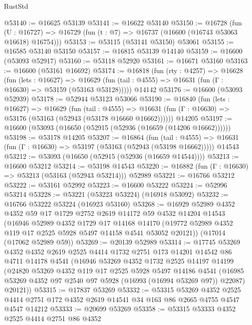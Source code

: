 \begin{lexlean}{RustStd}
\begin{coremodule}
{\begin{coremodule}
{{{{{{{{{{{{{{{{{{{{{{{{{{{{{{{{{{{{{{{{{{{{{{{{{{{{{{{@53140 := @16625 @53139
@53141 := @16622 @53140
@53150 := @16728
    (fun (U : @16727) => @16729 (fun (t : @7) => @16737 (@16600 (@16743 @53063 @16618) @16754)))
@53153 := @53115 (@53141 @53150) @53061
@53155 := @16585 @53140 @53150
@53157 := @16815 @53139 @14140
@53159 := @16600 (@53093 @52917)
@53160 := @53118 @52920
@53161 := @16671 @53160
@53163 := @16600 (@53161 @16692)
@53174 := @16818
    (fun (rty : @4257) =>
    @16628
      (fun (lets : @16627) =>
      @16629 (fun (tail : @4555) => @16631 (fun (Γ : @16630) => @53159 (@53163 @53128)))))
    @14142
@53176 := @16600 (@53093 @52939)
@53178 := @52944 @53123 @53066
@53190 := @16840
    (fun (lets : @16627) =>
    @16629
      (fun (tail : @4555) =>
      @16631 (fun (Γ : @16630) => @53176 (@53163 (@52943 (@53178 @16660 @16662))))))
    @14205
@53197 := @16600 (@53093 (@16650 (@52915 (@52936 (@16659 (@14206 @16662))))))
@53198 := @53178 @14205
@53207 := @16864
    (fun (tail : @4555) => @16631 (fun (Γ : @16630) => @53197 (@53163 (@52943 (@53198 @16662)))))
    @14543
@53212 := @53093 (@16650 (@52915 (@52936 (@16659 @14544))))
@53213 := @16600 @53212
@53214 := @53198 @14543
@53220 := @16882 (fun (Γ : @16630) => @53213 (@53163 (@52943 @53214))) @52989
@53221 := @16766 @53212
@53222 := @53161 @52992
@53223 := @16600 @53222
@53224 := @52996 @53214
@53228 := @53221 (@53223 @53224) (@16918 @53092)
@53232 := @16766 @53222 @53224 (@16923 @53160)
@53268 := @16929
    @52989
    @4352
    @4352
    @59
    @17
    @1729
    @2752
    @2619
    @14172
    @59
    @4532
    @14204
    @14543
    (@16946
      @52989
      @4352
      @1729
      @17
      @14168
      @14170
      (@19772 @52989 @4352 @119 @17 @2525 @5928 @5497 @14158 @4541 @53052 @20121))
    (@17014 (@17062 @52989 @59))
@53269 := @20139 @52989
@53314 := @17745
    @53269
    @4352
    @4352
    @2619
    @2525
    @4414
    @1732
    @2751
    @173
    @14201
    @14542
    @86
    @4711
    @14178
    @4541
    (@16946
      @53269
      @4352
      @1732
      @2525
      @14197
      @14199
      (@24820
        @53269
        @4352
        @119
        @17
        @2525
        @5928
        @5497
        @14186
        @4541
        (@16985 @53269 @4352 @97 @2540 @97 @5928 (@16993 (@16994 @53269 @97)) @22087)
        @20121))
@53315 := @17837 @53269
@53332 := @53315
    @53269
    @4352
    @2525
    @4414
    @2751
    @172
    @4352
    @2619
    @14541
    @34
    @163
    @86
    @2665
    @4755
    @4547
    @4547
    @14212
@53333 := @20699 @53269
@53358 := @53315
    @53333
    @4352
    @2525
    @4414
    @2751
    @86
    @4352
}}}}}}}}}}}}}}}}}}}}}}}}}}}}}}}}}}}}}}}}}}}}}}}}}}}}}}}
\end{coremodule}}
\end{coremodule}
\end{lexlean}
